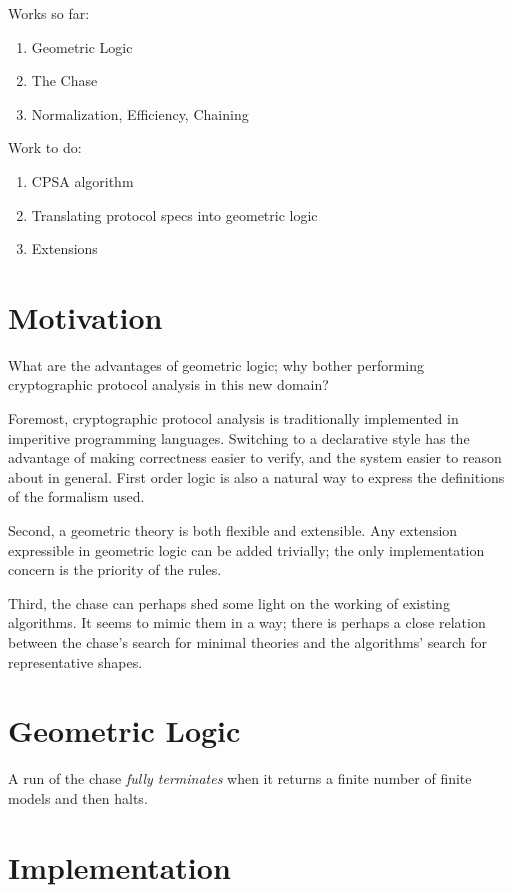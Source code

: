 \documentclass[12pt]{article}
\def\term{\emph}
\begin{document}
Works so far:
\begin{enumerate}
\item Geometric Logic
\item The Chase
\item Normalization, Efficiency, Chaining
\end{enumerate}

Work to do:
\begin{enumerate}
\item CPSA algorithm
\item Translating protocol specs into geometric logic
\item Extensions
\end{enumerate}

\section{Motivation}

What are the advantages of geometric logic; why bother performing
cryptographic protocol analysis in this new domain?

Foremost, cryptographic protocol analysis is traditionally implemented
in imperitive programming languages. Switching to a declarative style
has the advantage of making correctness easier to verify, and the
system easier to reason about in general. First order logic is also a
natural way to express the definitions of the formalism used.

Second, a geometric theory is both flexible and extensible. Any
extension expressible in geometric logic can be added trivially; the
only implementation concern is the priority of the rules.

Third, the chase can perhaps shed some light on the working of
existing algorithms. It seems to mimic them in a way; there is perhaps
a close relation between the chase's search for minimal theories and
the algorithms' search for representative shapes.

\section{Geometric Logic}

A run of the chase \term{fully terminates} when it returns a finite
number of finite models and then halts.

\section{Implementation}
\end{document}
